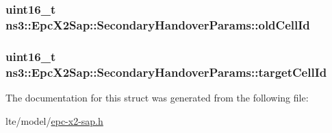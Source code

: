 \subsubsection[{\texorpdfstring{old\+Cell\+Id}{oldCellId}}]{\setlength{\rightskip}{0pt plus 5cm}uint16\+\_\+t ns3\+::\+Epc\+X2\+Sap\+::\+Secondary\+Handover\+Params\+::old\+Cell\+Id}\hypertarget{structns3_1_1EpcX2Sap_1_1SecondaryHandoverParams_a0c1239c9d49a4403206fa1f7626386aa}{}\label{structns3_1_1EpcX2Sap_1_1SecondaryHandoverParams_a0c1239c9d49a4403206fa1f7626386aa}
\subsubsection[{\texorpdfstring{target\+Cell\+Id}{targetCellId}}]{\setlength{\rightskip}{0pt plus 5cm}uint16\+\_\+t ns3\+::\+Epc\+X2\+Sap\+::\+Secondary\+Handover\+Params\+::target\+Cell\+Id}\hypertarget{structns3_1_1EpcX2Sap_1_1SecondaryHandoverParams_a4e9b254b153f3a047b8b818d224dd002}{}\label{structns3_1_1EpcX2Sap_1_1SecondaryHandoverParams_a4e9b254b153f3a047b8b818d224dd002}


The documentation for this struct was generated from the following file\+:\begin{DoxyCompactItemize}
\item 
lte/model/\hyperlink{epc-x2-sap_8h}{epc-\/x2-\/sap.\+h}\end{DoxyCompactItemize}
